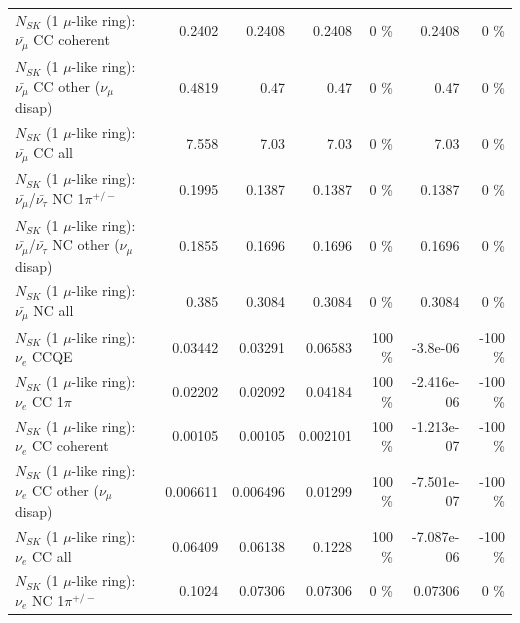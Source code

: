 \begin{table}
\begin{tabular}{| l | r | r | r  r | r  r |}
                       $N_{SK}$ (1 $\mu$-like ring): $\bar{\nu_\mu}$ CC coherent &          0.2402 &          0.2408 &          0.2408 &        0 \%  &          0.2408 &        0 \%  \\ 
        $N_{SK}$ (1 $\mu$-like ring): $\bar{\nu_\mu}$ CC other ($\nu_\mu$ disap) &          0.4819 &            0.47 &            0.47 &        0 \%  &            0.47 &        0 \%  \\ 
                          $N_{SK}$ (1 $\mu$-like ring): $\bar{\nu_{\mu}}$ CC all &           7.558 &            7.03 &            7.03 &        0 \%  &            7.03 &        0 \%  \\ 
\hline
  $N_{SK}$ (1 $\mu$-like ring): $\bar{\nu_\mu}$/$\bar{\nu_\tau}$ NC 1$\pi^{+/-}$ &          0.1995 &          0.1387 &          0.1387 &        0 \%  &          0.1387 &        0 \%  \\ 
$N_{SK}$ (1 $\mu$-like ring): $\bar{\nu_\mu}$/$\bar{\nu_\tau}$ NC other ($\nu_\mu$ disap) &          0.1855 &          0.1696 &          0.1696 &        0 \%  &          0.1696 &        0 \%  \\ 
                          $N_{SK}$ (1 $\mu$-like ring): $\bar{\nu_{\mu}}$ NC all &           0.385 &          0.3084 &          0.3084 &        0 \%  &          0.3084 &        0 \%  \\ 
\hline
\hline
\hline
                                      $N_{SK}$ (1 $\mu$-like ring): $\nu_e$ CCQE &         0.03442 &         0.03291 &         0.06583 &      100 \%  &        -3.8e-06 &     -100 \%  \\ 
                                 $N_{SK}$ (1 $\mu$-like ring): $\nu_e$ CC 1$\pi$ &         0.02202 &         0.02092 &         0.04184 &      100 \%  &      -2.416e-06 &     -100 \%  \\ 
                               $N_{SK}$ (1 $\mu$-like ring): $\nu_e$ CC coherent &         0.00105 &         0.00105 &        0.002101 &      100 \%  &      -1.213e-07 &     -100 \%  \\ 
                $N_{SK}$ (1 $\mu$-like ring): $\nu_e$ CC other ($\nu_\mu$ disap) &        0.006611 &        0.006496 &         0.01299 &      100 \%  &      -7.501e-07 &     -100 \%  \\ 
                                  $N_{SK}$ (1 $\mu$-like ring): $\nu_{e}$ CC all &         0.06409 &         0.06138 &          0.1228 &      100 \%  &      -7.087e-06 &     -100 \%  \\ 
\hline
                           $N_{SK}$ (1 $\mu$-like ring): $\nu_e$ NC 1$\pi^{+/-}$ &          0.1024 &         0.07306 &         0.07306 &        0 \%  &         0.07306 &        0 \%  \\ 

\end{tabular}
\end{table}
